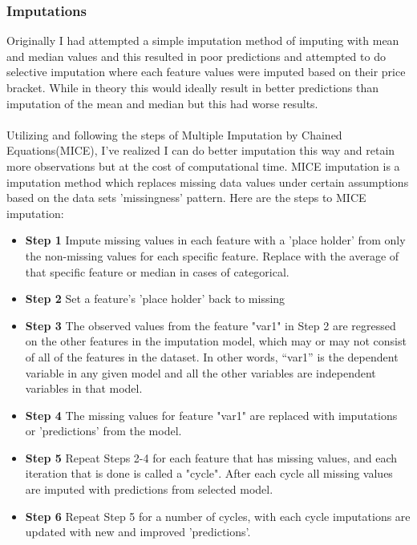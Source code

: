 \documentclass{article}
\begin{document}
\begin{titlepage}
\subsubsection{Imputations}
    Originally I had attempted a simple imputation method of imputing with mean and median values and this resulted in poor predictions and attempted to do selective imputation where each feature values were imputed based on their price bracket. While in theory this would ideally result in better predictions than imputation of the mean and median but this had worse results. \\
    \\
    Utilizing and following the steps of Multiple Imputation by Chained Equations(MICE), I've realized I can do better imputation this way and retain more observations but at the cost of computational time. MICE imputation is a imputation method which replaces missing data values under certain assumptions based on the data sets 'missingness' pattern. Here are the steps to MICE imputation:

    \begin{itemize}
        \item \textbf{Step 1} Impute missing values in each feature with a 'place holder' from only the non-missing values for each specific feature. Replace with the average of that specific feature or median in cases of categorical.
        \item \textbf{Step 2} Set a feature's 'place holder' back to missing
        \item \textbf{Step 3} The observed values from the feature "var1" in Step 2 are regressed on the other features in the imputation model, which may or may not consist of all of the features in the dataset. In other words, “var1” is the dependent variable in any given model and all the other variables are independent variables in that  model.
        \item \textbf{Step 4} The missing values for feature "var1" are replaced with imputations or 'predictions' from the model.
        \item \textbf{Step 5} Repeat Steps 2-4 for each feature that has missing values, and each iteration that is done is called a "cycle". After each cycle all missing values are imputed with predictions from selected model.
        \item \textbf{Step 6} Repeat Step 5 for a number of cycles, with each cycle imputations are updated with new and improved 'predictions'.
    \end{itemize}


\end{titlepage}
\end{document}
